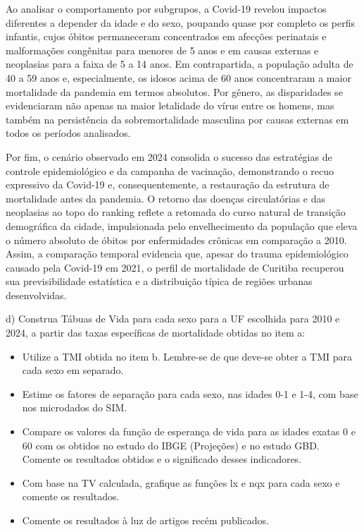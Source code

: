 \documentclass[
  letterpaper,
  DIV=11,
  numbers=noendperiod]{scrartcl}
\begin{document}
Ao analisar o comportamento por subgrupos, a Covid-19 revelou impactos
diferentes a depender da idade e do sexo, poupando quase por completo os
perfis infantis, cujos óbitos permaneceram concentrados em afecções
perinatais e malformações congênitas para menores de 5 anos e em causas
externas e neoplasias para a faixa de 5 a 14 anos. Em contrapartida, a
população adulta de 40 a 59 anos e, especialmente, os idosos acima de 60
anos concentraram a maior mortalidade da pandemia em termos absolutos.
Por gênero, as disparidades se evidenciaram não apenas na maior
letalidade do vírus entre os homens, mas também na persistência da
sobremortalidade masculina por causas externas em todos os períodos
analisados.

Por fim, o cenário observado em 2024 consolida o sucesso das estratégias
de controle epidemiológico e da campanha de vacinação, demonstrando o
recuo expressivo da Covid-19 e, consequentemente, a restauração da
estrutura de mortalidade antes da pandemia. O retorno das doenças
circulatórias e das neoplasias ao topo do ranking reflete a retomada do
curso natural de transição demográfica da cidade, impulsionada pelo
envelhecimento da população que eleva o número absoluto de óbitos por
enfermidades crônicas em comparação a 2010. Assim, a comparação temporal
evidencia que, apesar do trauma epidemiológico causado pela Covid-19 em
2021, o perfil de mortalidade de Curitiba recuperou sua previsibilidade
estatística e a distribuição típica de regiões urbanas desenvolvidas.

d) Construa Tábuas de Vida para cada sexo para a UF escolhida para 2010
e 2024, a partir das taxas específicas de mortalidade obtidas no item a:

\begin{itemize}
\item
  Utilize a TMI obtida no item b. Lembre-se de que deve-se obter a TMI
  para cada sexo em separado.
\item
  Estime os fatores de separação para cada sexo, nas idades 0-1 e 1-4,
  com base nos microdados do SIM.
\item
  Compare os valores da função de esperança de vida para as idades
  exatas 0 e 60 com os obtidos no estudo do IBGE (Projeções) e no estudo
  GBD. Comente os resultados obtidos e o significado desses indicadores.
\item
  Com base na TV calculada, grafique as funções lx e nqx para cada sexo
  e comente os resultados.
\item
  Comente os resultados à luz de artigos recém publicados.
\end{itemize}
\end{document}
